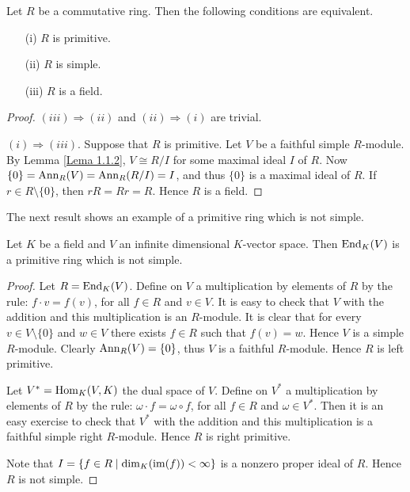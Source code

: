 \begin{proposition}\label{Prop1.2.1}
Let $R$ be a commutative ring. Then the following conditions are equivalent.
\begin{itemize}\item[(i)] $R$ is primitive.
\item[(ii)] $R$ is simple.
\item[(iii)] $R$ is a field.
\end{itemize}
\end{proposition}

\begin{proof}
$(iii)\Rightarrow (ii)$ and $(ii)\Rightarrow (i)$ are trivial.

$(i)\Rightarrow (iii)$. Suppose that $R$ is primitive. Let $V$ be
a faithful simple $R$-module. By Lemma \ref{Lema 1.1.2}, $V\cong R/I$ for some maximal ideal $I$ of $R$. 
Now $\{0\}=\operatorname{Ann}_R(V)=\operatorname{Ann}_R(R/I)=I$, and thus $\{0\}$ is a maximal ideal of $R$. If $r\in R\setminus \{ 0\}$, then
$rR=Rr=R$. Hence $R$ is a field.
\end{proof}

The next result shows an example of a primitive ring which is not simple.

\begin{proposition}\label{Prop1.2.2}
Let $K$ be a field and $V$ an infinite dimensional $K$-vector space. Then
$\operatorname{End}_K(V)$ is a primitive ring which is not simple.
\end{proposition}

\begin{proof}
Let $R=\operatorname{End}_K(V)$. Define on $V$ a multiplication by elements of $R$ by the rule: $f\cdot v=f(v)$, for all $f\in R$ and $v\in V$.
It is easy to check that $V$ with the addition and this multiplication is an $R$-module.
It is clear that for every $v\in V\setminus \{ 0\}$ and $w\in V$ there exists
$f\in R$ such that $f(v)=w$. Hence $V$ is a simple $R$-module. Clearly $\operatorname{Ann}_R(V)=\{0\}$, thus $V$ is a faithful $R$-module. 
Hence $R$ is left primitive.

Let $V^*=\operatorname{Hom}_K(V,K)$ the dual space of $V$. Define on $V^*$ a multiplication by elements of $R$ by the rule: 
$\omega\cdot f=\omega\circ f$, for all $f\in R$ and $\omega\in V^*$. Then it is an easy exercise to check that $V^*$ with the addition
and this multiplication is a faithful simple right $R$-module. Hence $R$ is right primitive.

Note that $I=\{ f\in R\mid \dim_K(\operatorname{im}(f))<\infty\}$ is a nonzero proper ideal of $R$. Hence $R$ is not simple. 
\end{proof}

